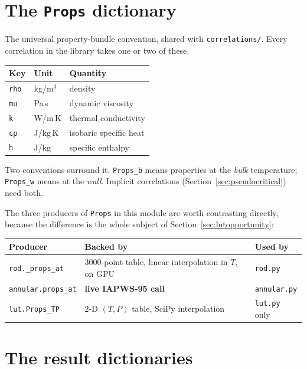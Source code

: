 \documentclass[11pt]{article}
\newcommand{\code}[1]{\texttt{#1}}
\begin{document}
\section{The \code{Props} dictionary}
\label{sec:props}

The universal property-bundle convention, shared with \code{correlations/}. Every
correlation in the library takes one or two of these.

\begin{center}
\begin{tabular}{lll}
\toprule
Key & Unit & Quantity \\
\midrule
\code{rho} & kg/m$^3$ & density \\
\code{mu}  & Pa\,s & dynamic viscosity \\
\code{k}   & W/m\,K & thermal conductivity \\
\code{cp}  & J/kg\,K & isobaric specific heat \\
\code{h}   & J/kg & specific enthalpy \\
\bottomrule
\end{tabular}
\end{center}

Two conventions surround it. \code{Props\_b} means properties at the \emph{bulk}
temperature; \code{Props\_w} means at the \emph{wall}. Implicit correlations
(Section~\ref{sec:pseudocritical}) need both.

The three producers of \code{Props} in this module are worth contrasting directly,
because the difference is the whole subject of Section~\ref{sec:lutopportunity}:

\begin{center}
\begin{tabular}{lp{4.1cm}p{5.4cm}}
\toprule
Producer & Backed by & Used by \\
\midrule
\code{rod.\_props\_at} & 3000-point table, linear interpolation in $T$, on GPU & \code{rod.py} \\
\code{annular.props\_at} & \textbf{live IAPWS-95 call} & \code{annular.py} \\
\code{lut.Props\_TP} & 2-D $(T,P)$ table, SciPy interpolation & \code{lut.py} only \\
\bottomrule
\end{tabular}
\end{center}

\section{The result dictionaries}
\end{document}

